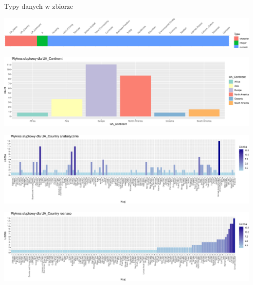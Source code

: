 \documentclass[
  12pt,
]{article}
\begin{document}
Typy danych w zbiorze

\begin{center}\includegraphics{Sprawozdanie2_files/figure-latex/typy_danych-1} \end{center}

\begin{center}\includegraphics{Sprawozdanie2_files/figure-latex/wykresy_jakosciowe-1} \end{center}

\begin{center}\includegraphics{Sprawozdanie2_files/figure-latex/wykresy_jakosciowe-2} \end{center}

\begin{center}\includegraphics{Sprawozdanie2_files/figure-latex/wykresy_jakosciowe-3} \end{center}
\end{document}
